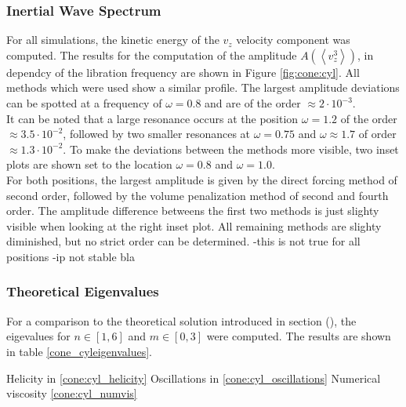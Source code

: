 \subsubsection{Inertial Wave Spectrum}

For all simulations, the kinetic energy of the $v_z$ velocity component was computed.
The results for the computation of the amplitude $A\left(\left<v_z^3\right>\right)$, in dependcy of the libration
frequency are shown in Figure \ref{fig:cone:cyl}.
All methods which were used show a similar profile.
The largest amplitude deviations can be spotted at a frequency of $\omega=0.8$ and are of the order $\approx2\cdot10^{-3}$.\\
It can be noted that a large resonance  occurs at the position $\omega=1.2$ of the order $\approx3.5\cdot10^{-2}$, followed by two
smaller resonances at $\omega=0.75$ and $\omega\approx1.7$ of order $\approx1.3\cdot10^{-2}$.
To make the deviations between the methods more visible, two inset plots are shown
set to the location $\omega=0.8$ and $\omega=1.0$.\\
For both positions, the largest amplitude is given by the direct forcing method of second order, followed by
the volume penalization method of second and fourth order.
The amplitude difference betweens the first two methods is just slighty visible when looking at the right inset plot.
All remaining methods are slighty diminished, but no strict order can be determined.
-this is not true for all positions
-ip not stable bla

\subsubsection{Theoretical Eigenvalues}

For a comparison to the theoretical solution introduced in section (),
the eigevalues for $n\in[1,6]$ and $m\in[0, 3]$ were  computed.
The results are shown in table \ref{cone_cyleigenvalues}.

Helicity in          \ref{cone:cyl_helicity}
Oscillations in      \ref{cone:cyl_oscillations}
Numerical viscosity  \ref{cone:cyl_numvis}

